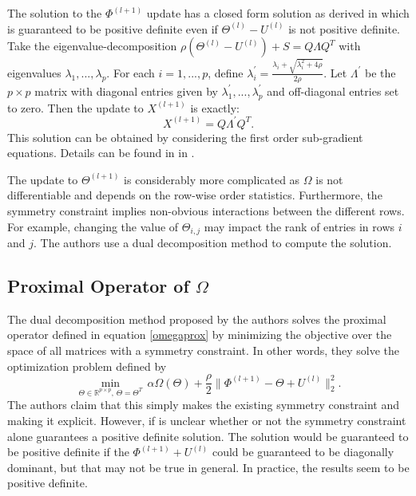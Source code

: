 \documentclass{uwstat572}
\theoremstyle{remark}
\theoremstyle{definition}
\begin{document}
The solution to the $\Phi^{(l+1)}$ update has a closed form solution as derived in \cite{Boyd2011} which is guaranteed to be positive definite even if $\Theta^{(l)} - U^{(l)}$ is not positive definite.  Take the eigenvalue-decomposition $\rho(\Theta^{(l)} - U^{(l)}) + S =  Q \Lambda Q^T$ with eigenvalues $\lambda_1,...,\lambda_p$.  For each $i = 1,...,p$, define $\lambda^{\prime}_i = \frac{\lambda_i + \sqrt{\lambda_i^2 + 4\rho}}{2 \rho}$.  Let $\Lambda^{\prime}$ be the $p \times p$ matrix with diagonal entries given by $\lambda^{\prime}_1,...,\lambda^{\prime}_p$ and off-diagonal entries set to zero.  Then the update to $X^{(l+1)}$ is exactly:
\begin{equation*}
X^{(l+1)} = Q \Lambda^{\prime} Q^T.
\end{equation*}
This solution can be obtained by considering the first order sub-gradient equations.  Details can be found in in \cite{Boyd2011}.

The update to $\Theta^{(l+1)}$ is considerably more complicated as $\Omega$ is not differentiable and depends on the row-wise order statistics.  Furthermore, the symmetry constraint implies non-obvious interactions between the different rows.  For example, changing the value of $\Theta_{i,j}$ may impact the rank of entries in rows $i$ and $j$. The authors use a dual decomposition method to compute the solution.  


\subsection{Proximal Operator of $\Omega$}

The dual decomposition method proposed by the authors solves the proximal operator defined in equation \eqref{omegaprox} by minimizing the objective over the space of all matrices with a symmetry constraint.  In other words, they solve the optimization problem defined by
\begin{equation}\label{dualdecomp}
\min_{\Theta \in \mathbb{R}^{p \times p}, \, \Theta = \Theta^T} \, \alpha \Omega(\Theta) + \frac{\rho}{2} \| \Phi^{(l+1)} - \Theta + U^{(l)} \|_2^2.
\end{equation}
The authors claim that this simply makes the existing symmetry constraint and making it explicit.  However, if is unclear whether or not the symmetry constraint alone guarantees a positive definite solution.  The solution would be guaranteed to be positive definite if the $\Phi^{(l+1)} + U^{(l)}$ could be guaranteed to be diagonally dominant, but that may not be true in general.  In practice, the results seem to be positive definite.
\end{document}
